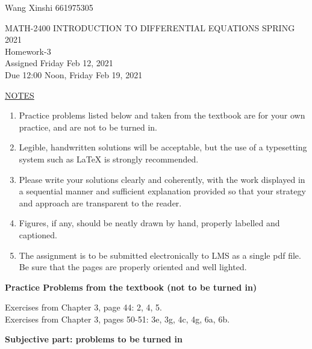 \documentclass{article}
\newcommand{\bc}{\begin{center}}
\newcommand{\ec}{\end{center}}
\newcommand{\ul}{\underline}
\newcommand{\n}{\noindent}
\newcommand{\benum}{\begin{enumerate}}
\newcommand{\eenum}{\end{enumerate}}
\newcommand{\blue}{\color{blue}}
\newcommand{\nc}{\normalcolor}
\begin{document}
Wang Xinshi 661975305\\
\begin{center}
\large{ MATH-2400 \hspace{.25in}  INTRODUCTION TO DIFFERENTIAL EQUATIONS \hspace{.25in}SPRING 2021\\ Homework-3   \\ Assigned Friday Feb 12, 2021 \\ Due 12:00 Noon, Friday Feb 19, 2021}\end{center}

\bigskip
\n\ul{NOTES}
\benum
\item 
Practice problems listed below and taken from the textbook are for your own practice, and are not to be turned in.
\item 
Legible, handwritten solutions will be acceptable, but the use of a typesetting system such as LaTeX is strongly recommended.  \blue{\bf Do not turn in your rough attempt at solving a problem; once you have worked out the solution, copy it neatly or typeset it before submission, after removing all false starts.}\nc
\item 
Please write your solutions clearly and coherently, with the work displayed in a sequential manner and sufficient explanation provided so that your strategy and approach are transparent to the reader. 
\item 
Figures, if any, should be neatly drawn by hand, properly labelled and captioned.  
\item 
The assignment is to be submitted electronically to LMS  as a single pdf file.  Be sure that the pages are properly oriented and well lighted.  \blue{\bf Please do not e-mail your homework submission to the TAs or the instructors.}\nc
\eenum

\bigskip


\bc {\bf Practice Problems from the textbook (not to be turned in)} \ec

\n Exercises from Chapter 3, page 44: 2, 4, 5.\\
\n Exercises from Chapter 3, pages 50-51: 3e, 3g, 4c, 4g, 6a, 6b.


\medskip
\bc {\bf Subjective part: problems to be turned in} \ec
\end{document}
